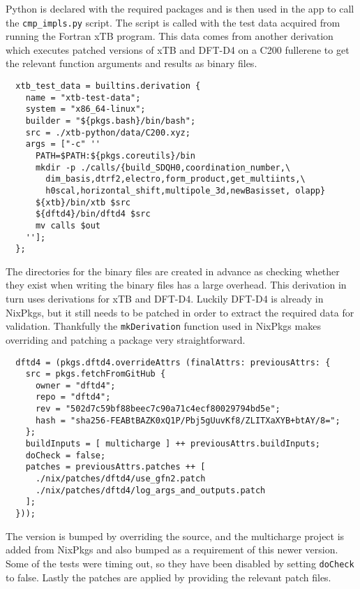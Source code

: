 Python is declared with the required packages and is then used in the app to call the \verb|cmp_impls.py| script. The script is called with the test data acquired from running the Fortran xTB program. This data comes from another derivation which executes patched versions of xTB and DFT-D4 on a C200 fullerene to get the relevant function arguments and results as binary files.

\begin{verbatim}
  xtb_test_data = builtins.derivation {
    name = "xtb-test-data";
    system = "x86_64-linux";
    builder = "${pkgs.bash}/bin/bash";
    src = ./xtb-python/data/C200.xyz;
    args = ["-c" ''
      PATH=$PATH:${pkgs.coreutils}/bin
      mkdir -p ./calls/{build_SDQH0,coordination_number,\
        dim_basis,dtrf2,electro,form_product,get_multiints,\
        h0scal,horizontal_shift,multipole_3d,newBasisset, olapp}
      ${xtb}/bin/xtb $src
      ${dftd4}/bin/dftd4 $src
      mv calls $out
    ''];
  };
\end{verbatim}

The directories for the binary files are created in advance as checking whether they exist when writing the binary files has a large overhead.
This derivation in turn uses derivations for xTB and DFT-D4. Luckily DFT-D4 is already in NixPkgs, but it still needs to be patched in order to extract the required data for validation. Thankfully the \verb|mkDerivation| function used in NixPkgs makes overriding and patching a package very straightforward. 

\begin{verbatim}
  dftd4 = (pkgs.dftd4.overrideAttrs (finalAttrs: previousAttrs: {
    src = pkgs.fetchFromGitHub {
      owner = "dftd4";
      repo = "dftd4";
      rev = "502d7c59bf88beec7c90a71c4ecf80029794bd5e";
      hash = "sha256-FEABtBAZK0xQ1P/Pbj5gUuvKf8/ZLITXaXYB+btAY/8=";
    };
    buildInputs = [ multicharge ] ++ previousAttrs.buildInputs;
    doCheck = false;
    patches = previousAttrs.patches ++ [
      ./nix/patches/dftd4/use_gfn2.patch
      ./nix/patches/dftd4/log_args_and_outputs.patch
    ];
  }));
\end{verbatim}

The version is bumped by overriding the source, and the multicharge project is added from NixPkgs and also bumped as a requirement of this newer version. Some of the tests were timing out, so they have been disabled by setting \verb|doCheck| to false. Lastly the patches are applied by providing the relevant patch files.


